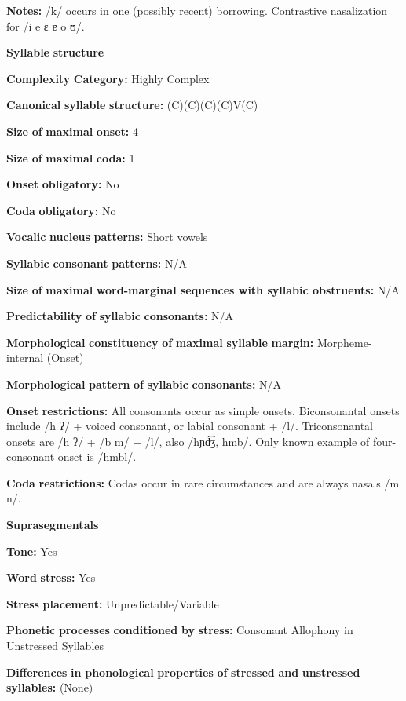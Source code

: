 \begin{styleBody}
\textbf{Notes:} /k/ occurs in one (possibly recent) borrowing. Contrastive nasalization for /i e ɛ ɐ o ʊ/.

\textbf{Syllable} \textbf{structure}

\textbf{Complexity} \textbf{Category:} Highly Complex

\textbf{Canonical} \textbf{syllable} \textbf{structure:} (C)(C)(C)(C)V(C) \citep[68-76]{Marmion2010}

\textbf{Size} \textbf{of} \textbf{maximal} \textbf{onset:} 4

\textbf{Size} \textbf{of} \textbf{maximal} \textbf{coda:} 1

\textbf{Onset} \textbf{obligatory:} No

\textbf{Coda} \textbf{obligatory:} No

\textbf{Vocalic} \textbf{nucleus} \textbf{patterns:} Short vowels

\textbf{Syllabic} \textbf{consonant} \textbf{patterns:} N/A

\textbf{Size} \textbf{of} \textbf{maximal} \textbf{word{}-marginal sequences with syllabic obstruents:} N/A

\textbf{Predictability} \textbf{of} \textbf{syllabic} \textbf{consonants:} N/A

\textbf{Morphological} \textbf{constituency} \textbf{of} \textbf{maximal} \textbf{syllable} \textbf{margin:} Morpheme-internal (Onset)

\textbf{Morphological} \textbf{pattern} \textbf{of} \textbf{syllabic} \textbf{consonants:} N/A

\textbf{Onset} \textbf{restrictions:} All consonants occur as simple onsets. Biconsonantal onsets include /h ʔ/ + voiced consonant, or labial consonant + /l/. Triconsonantal onsets are /h ʔ/ + /b m/ + /l/, also /hɲd͡ʒ, hmb/. Only known example of four-consonant onset is /hmbl/.

\textbf{Coda} \textbf{restrictions:} Codas occur in rare circumstances and are always nasals /m n/.

\textbf{Suprasegmentals}

\textbf{Tone:} Yes

\textbf{Word} \textbf{stress:} Yes

\textbf{Stress} \textbf{placement:} Unpredictable/Variable

\textbf{Phonetic} \textbf{processes} \textbf{conditioned} \textbf{by} \textbf{stress:} Consonant Allophony in Unstressed Syllables

\textbf{Differences} \textbf{in} \textbf{phonological} \textbf{properties} \textbf{of} \textbf{stressed} \textbf{and} \textbf{unstressed} \textbf{syllables:} (None)


\end{styleBody}

